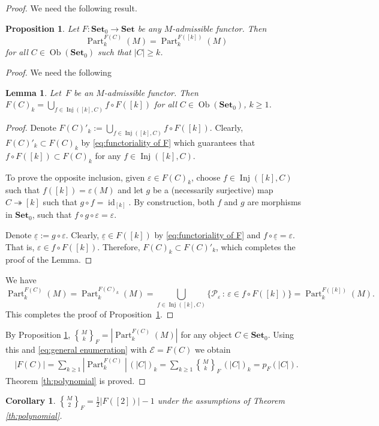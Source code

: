 \documentclass[12pt, reqno]{amsart}
\newcommand{\stirling}[2]{\genfrac{\{}{\}}{0pt}0{#1}{#2}}
\newcommand{\tstirling}[2]{\genfrac{\{}{\}}{0pt}1{#1}{#2}}
\newtheorem{corollary}[theorem]{Corollary}
\newtheorem{lemma}[theorem]{Lemma}
\newtheorem{proposition}[theorem]{Proposition}
\theoremstyle{definition}
\numberwithin{equation}{section}
\DeclareMathOperator*{\Ob}{Ob}
\DeclareMathOperator{\id}{id}
\DeclareMathOperator{\Inj}{Inj}
\DeclareMathOperator{\Part}{Part}
\newcommand{\EE}{{\mathcal{E}}}
\newcommand{\PP}{{\mathcal {P}}}
\begin{document}
\begin{proof}We need the following result.
\begin{proposition} 
\label{prop:F-invariance}
Let $F:\mathbf{Set}_0\to \mathbf{Set}$ be any $M$-admissible functor. Then
$$\Part^{F(C)}_k(M)=\Part_k^{F([k])}(M)$$ 
for all $C\in \Ob(\mathbf{Set}_0)$ such that $|C|\ge k$.
\end{proposition}
\begin{proof} 
We need the following
\begin{lemma} Let~$F$ be an $M$-admissible functor. Then
$F(C)_k=\bigcup\limits_{f\in \Inj([k],C)} f\circ F([k])$ for all $C\in \Ob(\mathbf{Set}_0)$, $k\ge 1$.
\end{lemma}
\begin{proof} Denote  $F(C)'_k:=\bigcup\limits_{f\in \Inj([k],C)} f\circ F([k])$. Clearly, $F(C)'_k\subset F(C)_k$ by  \eqref{eq:functoriality of F} which guarantees that $f\circ F([k])\subset F(C)_k$ for any $f\in \Inj([k],C)$. 

To prove the opposite inclusion, given $\varepsilon\in F(C)_k$, choose $f\in \Inj([k],C)$ such that $f([k])=\varepsilon(M)$ and let $g$ be a (necessarily surjective) map 
$C\twoheadrightarrow [k]$ such that $g\circ f=\id_{[k]}$. By construction, both $f$ and $g$ are morphisms in $\mathbf{Set}_0$, such that $f\circ g\circ \varepsilon=\varepsilon$.

Denote $\underline \varepsilon:=g\circ \varepsilon$. Clearly, $\underline \varepsilon\in F([k])$ by \eqref{eq:functoriality of F} and 
$f\circ \underline \varepsilon=\varepsilon$. That is, $\varepsilon\in f\circ F([k])$.
Therefore, $F(C)_k\subset F(C)'_k$, which completes the proof of the Lemma.
\end{proof}

We have
$$\Part_k^{F(C)}(M)=\Part_k^{F(C)_k}(M)=\bigcup\limits_{f\in \Inj([k],C)} 
\{\PP_\varepsilon\,:\,\varepsilon\in f\circ F([k])\}=\Part_k^{F([k])}(M).
$$
This completes the proof of Proposition~\ref{prop:F-invariance}.
\end{proof}
By Proposition \ref{prop:F-invariance}, ${\tstirling{M}{k}}_F=|\Part_k^{F(C)}(M)|$ for any object $C\in \mathbf{Set}_0$. 
Using this  and   \eqref{eq:general enumeration} with $\EE=F(C)$ we obtain
\begin{align*}
|F(C)|=\sum_{k\ge 1} |\Part_k^{F(C)}|\, (|C|)_k=\sum_{k\ge 1} {\stirling{M}{k}}_F\, (|C|)_k=p_F(|C|).
\end{align*}
Theorem \ref{th:polynomial} is proved.
\end{proof}
\begin{corollary}\label{cor:stirling F2}
$\tstirling{M}{2}_F=\frac{1}{2}|F([2])|-1$ under the assumptions of Theorem \ref{th:polynomial}. 
\end{corollary}
\end{document}
